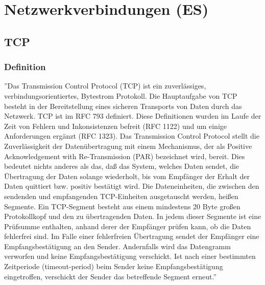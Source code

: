\newcommand\tab[1][1cm]{\hspace*{#1}}
\section{Netzwerkverbindungen (ES)}
\subsection{TCP}
\subsubsection{Definition}
''Das Transmission Control Protocol (TCP) ist ein zuverlässiges, verbindungsorientiertes, Bytestrom Protokoll. Die Hauptaufgabe von TCP besteht in der Bereitstellung eines sicheren Transports von Daten durch das Netzwerk. TCP ist im RFC 793 definiert. Diese Definitionen wurden im Laufe der Zeit von Fehlern und Inkonsistenzen befreit (RFC 1122) und um einige Anforderungen ergänzt (RFC 1323). Das Transmission Control Protocol stellt die Zuverlässigkeit der Datenübertragung mit einem Mechanismus, der als Positive Acknowledgement with Re-Transmission (PAR) bezeichnet wird, bereit. Dies bedeutet nichts anderes als das, daß das System, welches Daten sendet, die Übertragung der Daten solange wiederholt, bis vom Empfänger der Erhalt der Daten quittiert bzw. positiv bestätigt wird. Die Dateneinheiten, die zwischen den sendenden und empfangenden TCP-Einheiten ausgetauscht werden, heißen Segmente. Ein TCP-Segment besteht aus einem mindestens 20 Byte großen Protokollkopf und den zu übertragenden Daten. In jedem dieser Segmente ist eine Prüfsumme enthalten, anhand derer der Empfänger prüfen kann, ob die Daten fehlerfrei sind. Im Falle einer fehlerfreien Übertragung sendet der Empfänger eine Empfangsbestätigung an den Sender. Andernfalls wird das Datengramm verworfen und keine Empfangsbestätigung verschickt. Ist nach einer bestimmten Zeitperiode (timeout-period) beim Sender keine Empfangsbestätigung eingetroffen, verschickt der Sender das betreffende Segment erneut.'' \cite{noauthor_einfuhrung_nodate}
